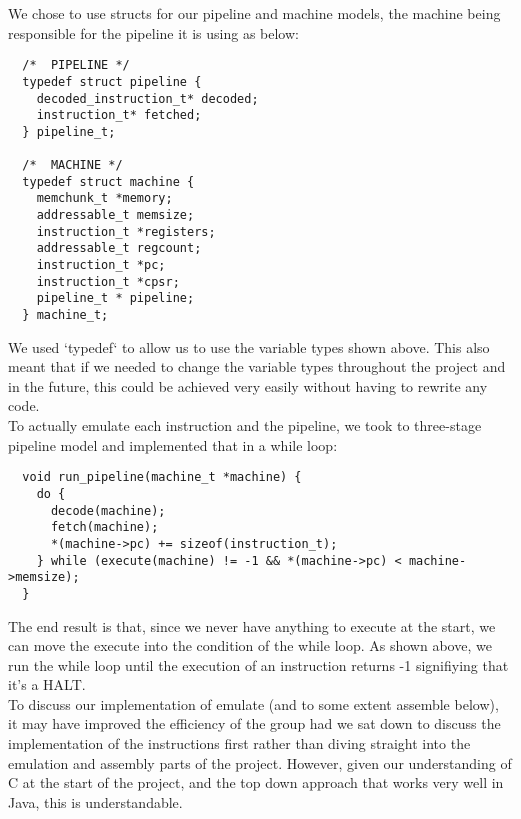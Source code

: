 We chose to use structs for our pipeline and machine models, the machine being responsible for the pipeline it is using as below:

\begin{verbatim}
  /*  PIPELINE */
  typedef struct pipeline {
    decoded_instruction_t* decoded;
    instruction_t* fetched;
  } pipeline_t;

  /*  MACHINE */
  typedef struct machine {
    memchunk_t *memory;
    addressable_t memsize;
    instruction_t *registers;
    addressable_t regcount;
    instruction_t *pc;
    instruction_t *cpsr;
    pipeline_t * pipeline;
  } machine_t;
\end{verbatim}

We used `typedef` to allow us to use the variable types shown above. This also meant that if we needed to change the variable types throughout the project and in the future, this could be achieved very easily without having to rewrite any code.
~\\

To actually emulate each instruction and the pipeline, we took to three-stage pipeline model and implemented that in a while loop: 

\begin{verbatim}
  void run_pipeline(machine_t *machine) {
    do {
      decode(machine);
      fetch(machine);
      *(machine->pc) += sizeof(instruction_t);
    } while (execute(machine) != -1 && *(machine->pc) < machine->memsize);
  }
\end{verbatim}

The end result is that, since we never have anything to execute at the start, we can move the execute into the condition of the while loop. As shown above, we run the while loop until the execution of an instruction returns -1 signifiying that it's a HALT.
~\\

To discuss our implementation of emulate (and to some extent assemble below), it may have improved the efficiency of the group had we sat down to discuss the implementation of the instructions first rather than diving straight into the emulation and assembly parts of the project. However, given our understanding of C at the start of the project, and the top down approach that works very well in Java, this is understandable.

